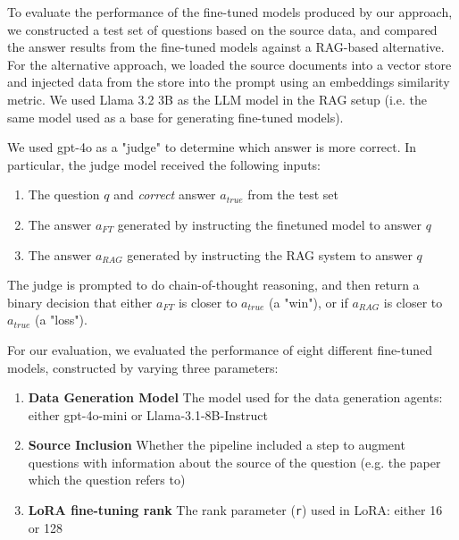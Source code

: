 To evaluate the performance of the fine-tuned models produced by our approach, we
constructed a test set of questions based on the source data, and compared the
answer results from the fine-tuned models against a RAG-based alternative. For
the alternative approach, we loaded the source documents into a vector store and
injected data from the store into the prompt using an embeddings similarity
metric. We used Llama 3.2 3B as the LLM model in the RAG setup (i.e. the same
model used as a base for generating fine-tuned models).

We used gpt-4o as a "judge" to determine which answer is more correct. In
particular, the judge model received the following inputs:
\begin{enumerate}
    \item The question $q$ and \emph{correct} answer $a_\mathit{true}$ from the test set
    \item The answer $a_\mathit{FT}$ generated by instructing the finetuned model to answer $q$
    \item The answer $a_\mathit{RAG}$ generated by instructing the RAG system to answer $q$
\end{enumerate}

The judge is prompted to do chain-of-thought reasoning, and then return a binary
decision that either $a_\mathit{FT}$ is closer to $a_\mathit{true}$ (a "win"),
or if $a_\mathit{RAG}$ is closer to $a_\mathit{true}$ (a "loss").

For our evaluation, we evaluated the performance of eight different fine-tuned
models, constructed by varying three parameters:

\begin{enumerate}
    \item \textbf{Data Generation Model} The model used for the data generation
    agents: either gpt-4o-mini or Llama-3.1-8B-Instruct
    \item \textbf{Source Inclusion} Whether the pipeline included a step to
    augment questions with information about the source of the question (e.g.
    the paper which the question refers to)
    \item \textbf{LoRA fine-tuning rank} The rank parameter (\texttt{r}) used in
    LoRA: either 16 or 128
\end{enumerate}
